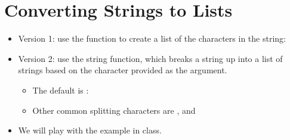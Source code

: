\documentclass[letterpaper,10pt,english]{sphinxmanual}
\begin{document}
\section{Converting Strings to Lists}
\label{\detokenize{lecture_notes/lec10_lists2:converting-strings-to-lists}}\begin{itemize}
\item {} 
Version 1: use the function  to create a list of the
characters in the string:

%
\begin{sphinxVerbatim}[commandchars=\\\{\}]
  
  
\end{sphinxVerbatim}

\item {} 
Version 2:  use the string  function, which breaks a string up into a
list of strings based on the character provided as the argument.
\begin{itemize}
\item {} 
The default is :

\item {} 
Other common splitting characters are ,  and

\end{itemize}

\item {} 
We will play with the  example in class.


\end{itemize}
\end{document}
